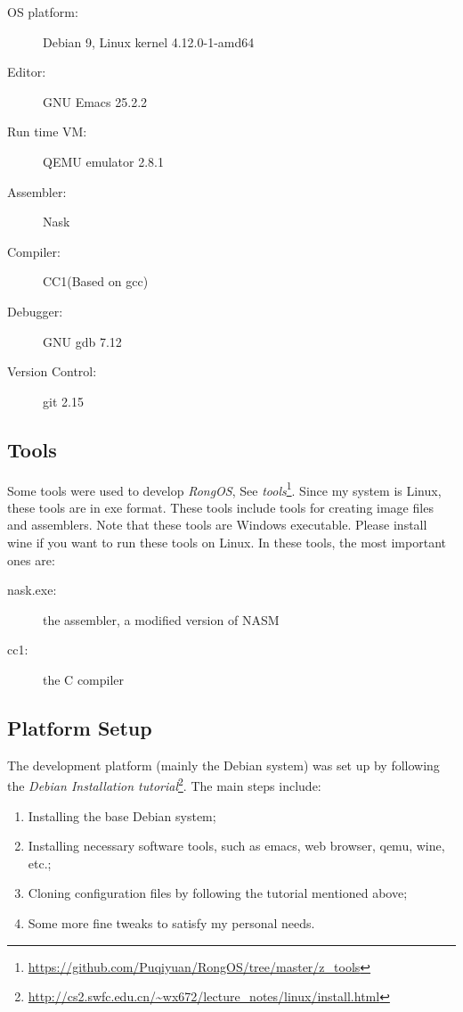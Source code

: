 \documentclass{swfcthesis}
\begin{document}
\begin{description}
\item[OS platform:] Debian 9, Linux kernel 4.12.0-1-amd64
\item[Editor:] GNU Emacs 25.2.2
\item[Run time VM:] QEMU emulator 2.8.1
\item[Assembler:] Nask
\item[Compiler:] CC1(Based on gcc)
\item[Debugger:] GNU gdb 7.12
\item[Version Control:] git 2.15
\end{description}

\subsection{Tools}

Some tools were used to develop \emph{RongOS}, See
\emph{tools}\footnote{\url{https://github.com/Puqiyuan/RongOS/tree/master/z_tools}}. Since
my system is Linux, these tools are in exe format. These tools include tools for creating
image files and assemblers. Note that these tools are Windows executable. Please install
wine if you want to run these tools on Linux. In these tools, the most important ones are:


\begin{description}
\item[nask.exe:] the assembler, a modified version of NASM\cite{30_os}
\item[cc1:] the C compiler
\end{description}

\subsection{Platform Setup}

The development platform (mainly the Debian system) was set up by following the
\emph{Debian Installation
  tutorial}\footnote{\url{http://cs2.swfc.edu.cn/~wx672/lecture_notes/linux/install.html}}. The
main steps include:
\begin{enumerate}
\item Installing the base Debian system;
\item Installing necessary software tools, such as emacs, web browser, qemu, wine, etc.;
\item Cloning configuration files by following the tutorial mentioned above;
\item Some more fine tweaks to satisfy my personal needs.
\end{enumerate}
\end{document}
